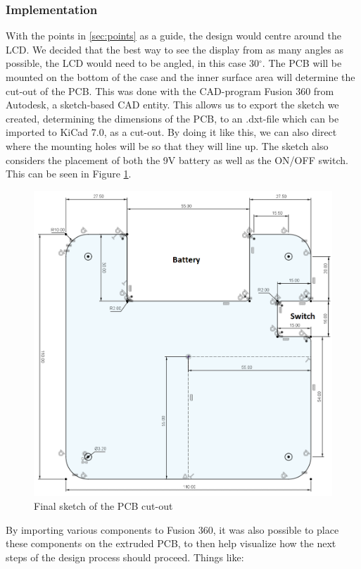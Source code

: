 \subsubsection{Implementation}
With the points in \ref{sec:points} as a guide, the design would centre around the LCD. We decided that the best way to see the display from as many angles as possible, the LCD would need to be angled, in this case 30$^{\circ}$. \newline
The PCB will be mounted on the bottom of the case and the inner surface area will determine the cut-out of the PCB. This was done with the CAD-program Fusion 360 from Autodesk, a sketch-based CAD entity. This allows us to export the sketch we created, determining the dimensions of the PCB, to an .dxt-file which can be imported to KiCad 7.0, as a cut-out. By doing it like this, we can also direct where the mounting holes will be so that they will line up.
The sketch also considers the placement of both the 9V battery as well as the ON/OFF switch. This can be seen in Figure \ref{fig:sketchPCB}.
\begin{figure}[h]
    \centering
    \includegraphics[width=\linewidth]{images/sketch-pcb-cutout.png}
    \caption{Final sketch of the PCB cut-out}
    \label{fig:sketchPCB}
\end{figure}
\newpage 
\noindent By importing various components to Fusion 360, it was also possible to place these components on the extruded PCB, to then help visualize how the next steps of the design process should proceed. Things like:
